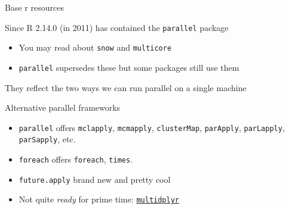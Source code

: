 \documentclass{hertieteaching}
\begin{document}
\begin{frame}[fragile]{Base r resources}

Since R 2.14.0 (in 2011) has contained the \texttt{parallel} package

\begin{itemize}

\item
  You may read about \texttt{snow} and \texttt{multicore}
\item
  \texttt{parallel} supersedes these but some packages still use them
\end{itemize}

They reflect the two ways we can run parallel on a single machine
\pause

\bigskip
Alternative parallel frameworks
\begin{itemize}
\item
  \texttt{parallel} offers \texttt{mclapply}, \texttt{mcmapply},
  \texttt{clusterMap}, \texttt{parApply}, \texttt{parLapply},
  \texttt{parSapply}, etc.
\item
  \texttt{foreach} offers \texttt{foreach}, \texttt{times}.
\item
  \texttt{future.apply} brand new and pretty cool
\item
  Not quite \textit{ready} for prime time:
  \href{https://github.com/hadley/multidplyr}{\texttt{multidplyr}}

\end{itemize}
\end{frame}
\end{document}

